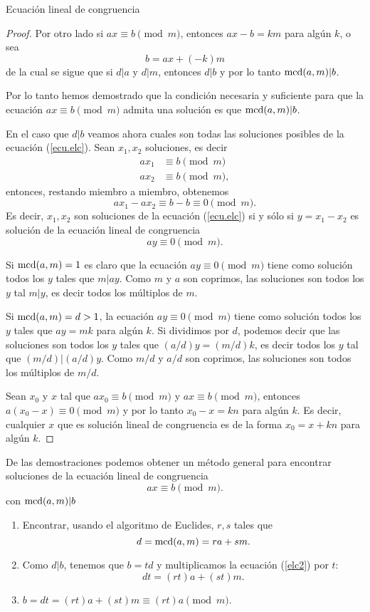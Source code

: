\begin{section}{Ecuación lineal de congruencia}
\begin{proof}
Por otro lado si $ax\equiv b\pmod{m}$, entonces $ax-b=km$ para
algún $k$, o sea
$$
b=ax+(-k)m
$$
de la cual se sigue que si $d|a$ y $d|m$, entonces $d|b$ y por lo
tanto $\operatorname{mcd}(a,m)|b$.

Por lo tanto hemos demostrado que la condición necesaria y
suficiente para que la ecuación $ax\equiv b \pmod{m}$ admita una
solución es que $\operatorname{mcd}(a,m)|b$.

En el caso que $d|b$ veamos ahora cuales son todas las soluciones posibles de la ecuación (\ref{ecu.elc}). Sean $x_1,x_2$ soluciones, es decir
\begin{align*}
ax_1 &\equiv b \pmod{m} \\
ax_2 &\equiv b \pmod{m},
\end{align*}
entonces, restando miembro a miembro, obtenemos
$$
ax_1 -ax_2 \equiv b - b \equiv 0 \pmod{m}.
$$
Es decir, $x_1,x_2$ son soluciones de la ecuación (\ref{ecu.elc}) si y sólo si  $y = x_1 -x_2$ es solución de la ecuación lineal de congruencia
\begin{equation*}
ay \equiv 0 \pmod{m}.
\end{equation*}

Si $\operatorname{mcd}(a,m) =1$ es claro que la ecuación $ay \equiv 0 \pmod{m}$ tiene como solución todos los $y$ tales que $m|ay$. Como $m$ y $a$ son  coprimos, las soluciones son todos los $y$ tal $m|y$, es decir todos los múltiplos de $m$.

Si $\operatorname{mcd}(a,m) =d > 1$,  la ecuación $ay \equiv 0 \pmod{m}$ tiene como solución todos los $y$ tales que $ay=mk$ para algún $k$. Si dividimos por $d$, podemos decir que las soluciones son todos los $y$ tales que $(a/d)y = (m/d)k$, es decir todos los $y$ tal que $(m/d)|(a/d)y$. Como $m/d$ y $a/d$ son coprimos, las soluciones son todos los múltiplos de $m/d$.

Sean $x_0$ y $x$ tal que $ax_0 \equiv b \pmod{m}$ y $ax \equiv b \pmod{m}$, entonces $a(x_0-x) \equiv 0 \pmod{m}$ y por lo tanto $x_0-x = kn$ para algún $k$. Es decir, cualquier $x$ que es solución lineal de congruencia es de la forma $x_0 = x+kn$ para algún $k$.
\end{proof}

De las demostraciones podemos obtener un método general para encontrar soluciones de la ecuación lineal de congruencia
$$
ax \equiv b \pmod{m}.
$$
con $\operatorname{mcd}(a,m)|b$


\begin{enumerate}[label=\textit{\alph*)}]
\item\label{elc-a}  Encontrar, usando el algoritmo de Euclides, $r,s$ tales que 
\begin{equation}\label{elc2}
d =\operatorname{mcd}(a,m) = ra+sm.
\end{equation}
\item\label{elc-b}  Como $d|b$, tenemos que $b = td$ y multiplicamos la ecuación (\ref{elc2}) por $t$: $$dt =  (rt)a+(st)m.$$
\item\label{elc-c}  $b = dt = (rt)a+(st)m \equiv (rt)a \pmod{m}$. 


\end{enumerate}
\end{section}
